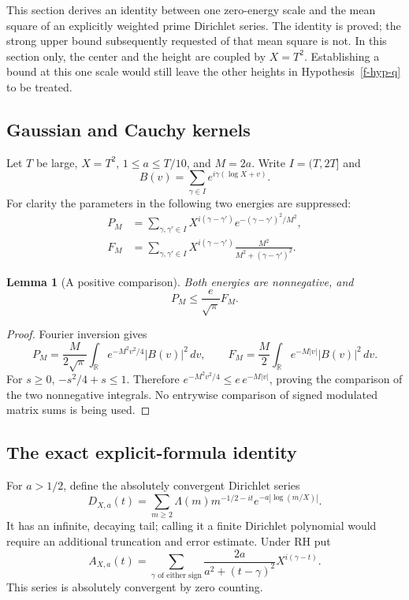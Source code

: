 \documentclass[11pt,a4paper]{article}
\newtheorem{lemma}[theorem]{Lemma}
\theoremstyle{definition}
\theoremstyle{remark}
\begin{document}
This section derives an identity between one zero-energy scale and the
mean square of an explicitly weighted prime Dirichlet series.  The identity
is proved; the strong upper bound subsequently requested of that mean
square is not.  In this section only, the center and the height are coupled
by $X=T^2$.  Establishing a bound at this one scale would still leave the
other heights in Hypothesis~\ref{f-hyp-q} to be treated.

\subsection{Gaussian and Cauchy kernels}
\label{f-sub-cauchy}

Let $T$ be large, $X=T^2$, $1\le a\le T/10$, and $M=2a$.  Write
$I=(T,2T]$ and
\[
 B(v)=\sum_{\gamma\in I}e^{i\gamma(\log X+v)}.
\]
For clarity the parameters in the following two energies are suppressed:
\begin{align}
 P_M&=\sum_{\gamma,\gamma'\in I}
 X^{i(\gamma-\gamma')}e^{-(\gamma-\gamma')^2/M^2},
 \label{f-eq-transfer-p}\\
 F_M&=\sum_{\gamma,\gamma'\in I}
 X^{i(\gamma-\gamma')}
 \frac{M^2}{M^2+(\gamma-\gamma')^2}.
 \label{f-eq-transfer-f}
\end{align}

\begin{lemma}[A positive comparison]
\label{f-lem-cauchy-comparison}
Both energies are nonnegative, and
\begin{equation}
 P_M\le\frac e{\sqrt\pi}F_M.
 \label{f-eq-cauchy-comparison}
\end{equation}
\end{lemma}

\begin{proof}
Fourier inversion gives
\[
 P_M=\frac M{2\sqrt\pi}\int_{\mathbb R}
 e^{-M^2v^2/4}|B(v)|^2\,dv,\qquad
 F_M=\frac M2\int_{\mathbb R}e^{-M|v|}|B(v)|^2\,dv.
\]
For $s\ge0$, $-s^2/4+s\le1$.  Therefore
$e^{-M^2v^2/4}\le e\,e^{-M|v|}$, proving the comparison of the two
nonnegative integrals.  No entrywise comparison of signed modulated
matrix sums is being used.
\end{proof}

\subsection{The exact explicit-formula identity}
\label{f-sub-series-identity}

For $a>1/2$, define the absolutely convergent Dirichlet series
\begin{equation}
 D_{X,a}(t)=\sum_{m\ge2}\Lambda(m)m^{-1/2-it}
 e^{-a|\log(m/X)|}.
 \label{f-eq-long-series}
\end{equation}
It has an infinite, decaying tail; calling it a finite Dirichlet polynomial
would require an additional truncation and error estimate.  Under RH put
\begin{equation}
 A_{X,a}(t)=\sum_{\gamma\text{ of either sign}}
 \frac{2a}{a^2+(t-\gamma)^2}X^{i(\gamma-t)}.
 \label{f-eq-a-all}
\end{equation}
This series is absolutely convergent by zero counting.
\end{document}
